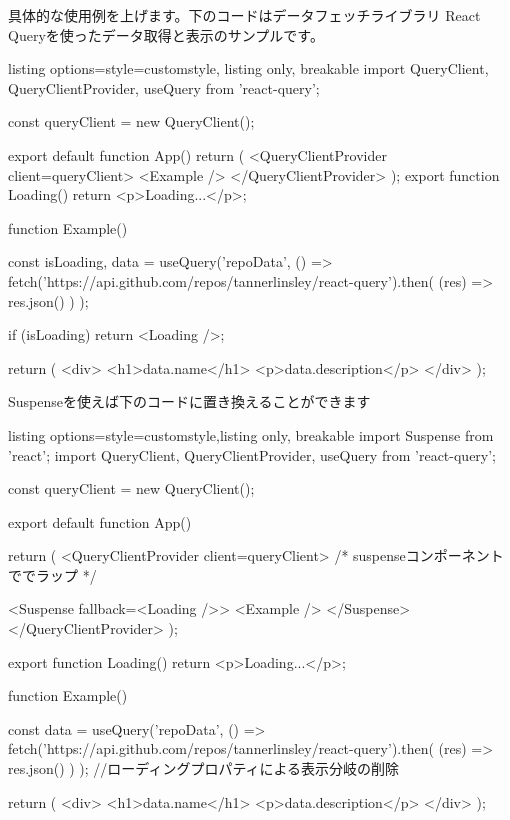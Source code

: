 具体的な使用例を上げます。下のコードはデータフェッチライブラリ React Queryを使ったデータ取得と表示のサンプルです。






\begin{tcblisting}{listing options={style=customstyle}, listing only, breakable}
  import { QueryClient, QueryClientProvider, useQuery } from 'react-query';

  const queryClient = new QueryClient();

  export default function App() {
  return (
  <QueryClientProvider client={queryClient}>
  <Example />
  </QueryClientProvider>
  );
  }
  export function Loading() {
      return <p>Loading...</p>;
    }

  function Example() {
      const { isLoading, data } = useQuery('repoData', () =>
      fetch('https://api.github.com/repos/tannerlinsley/react-query').then(
      (res) => res.json()
      )
      );

      if (isLoading) return <Loading />;

      return (
      <div>
        <h1>{data.name}</h1>
        <p>{data.description}</p>
      </div>
      );
    }
\end{tcblisting}




Suspenseを使えば下のコードに置き換えることができます


\begin{tcblisting}{listing options={style=customstyle},listing only, breakable}
  import { Suspense } from 'react';
  import { QueryClient, QueryClientProvider, useQuery } from 'react-query';

  const queryClient = new QueryClient();

  export default function App() {
  return (
  <QueryClientProvider client={queryClient}>
    {/* suspenseコンポーネントででラップ */}




  <Suspense fallback={<Loading />}>
  <Example />
  </Suspense>
  </QueryClientProvider>
  );
  }
  export function Loading() {
      return <p>Loading...</p>;
    }

  function Example() {
      const { data } = useQuery('repoData', () =>
      fetch('https://api.github.com/repos/tannerlinsley/react-query').then(
      (res) => res.json()
      )
      );
      //ローディングプロパティによる表示分岐の削除

      return (
      <div>
        <h1>{data.name}</h1>
        <p>{data.description}</p>
      </div>
      );
    }
\end{tcblisting}





